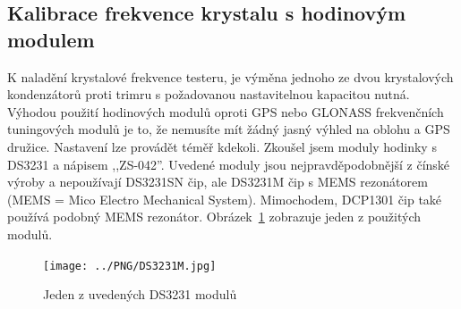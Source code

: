 \subsection{Kalibrace frekvence krystalu s hodinovým modulem}

K naladění krystalové frekvence testeru, je výměna jednoho ze dvou krystalových kondenzátorů
proti trimru s požadovanou nastavitelnou kapacitou nutná.
Výhodou použití hodinových modulů oproti GPS nebo GLONASS frekvenčních tuningových modulů je to,
že nemusíte mít žádný jasný výhled na oblohu a GPS družice.
Nastavení lze provádět téměř kdekoli.
Zkoušel jsem moduly hodinky s DS3231 a nápisem ,,ZS-042''.
Uvedené moduly jsou nejpravděpodobnější z čínské výroby a nepoužívají DS3231SN čip,
ale DS3231M čip s MEMS rezonátorem (MEMS = Mico Electro Mechanical System).
Mimochodem, DCP1301 čip také používá podobný MEMS rezonátor.
Obrázek~\ref{fig:DS3231M} zobrazuje jeden z použitých modulů.

\begin{figure}[H]
\centering
\texttt{[image: ../PNG/DS3231M.jpg]}
\caption{Jeden z uvedených DS3231 modulů}
\label{fig:DS3231M}
\end{figure}

